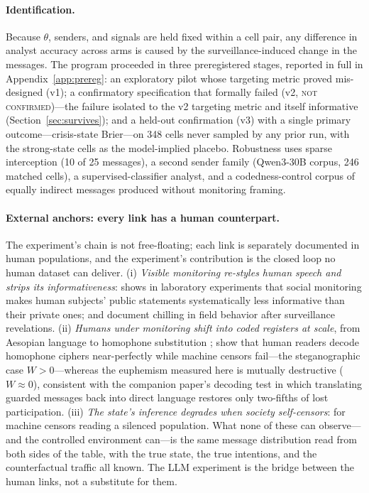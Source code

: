 \documentclass[11pt]{article}
\theoremstyle{remark}
\begin{document}
\paragraph{Identification.} Because $\theta$, senders, and signals are held fixed within a cell pair, any difference in analyst accuracy across arms is caused by the surveillance-induced change in the messages. The program proceeded in three preregistered stages, reported in full in Appendix~\ref{app:prereg}: an exploratory pilot whose targeting metric proved mis-designed (v1); a confirmatory specification that formally failed (v2, \textsc{not confirmed})---the failure isolated to the v2 targeting metric and itself informative (Section~\ref{sec:survives}); and a held-out confirmation (v3) with a single primary outcome---crisis-state Brier---on 348 cells never sampled by any prior run, with the strong-state cells as the model-implied placebo. Robustness uses sparse interception (10 of 25 messages), a second sender family (Qwen3-30B corpus, 246 matched cells), a supervised-classifier analyst, and a codedness-control corpus of equally indirect messages produced without monitoring framing.

\paragraph{External anchors: every link has a human counterpart.} The experiment's chain is not free-floating; each link is separately documented in human populations, and the experiment's contribution is the closed loop no human dataset can deliver. (i) \emph{Visible monitoring re-styles human speech and strips its informativeness}: \citet{braghieri2024} shows in laboratory experiments that social monitoring makes human subjects' public statements systematically less informative than their private ones; \citet{penney2016} and \citet{stoycheff2016} document chilling in field behavior after surveillance revelations. (ii) \emph{Humans under monitoring shift into coded registers at scale}, from Aesopian language to homophone substitution \citep{king2013, roberts2018}; \citet{hiruncharoenvate2015} show that human readers decode homophone ciphers near-perfectly while machine censors fail---the steganographic case $W > 0$---whereas the euphemism measured here is mutually destructive ($W \approx 0$), consistent with the companion paper's decoding test in which translating guarded messages back into direct language restores only two-fifths of lost participation. (iii) \emph{The state's inference degrades when society self-censors}: \citet{yang2025} for machine censors reading a silenced population. What none of these can observe---and the controlled environment can---is the same message distribution read from both sides of the table, with the true state, the true intentions, and the counterfactual traffic all known. The LLM experiment is the bridge between the human links, not a substitute for them.
\end{document}

